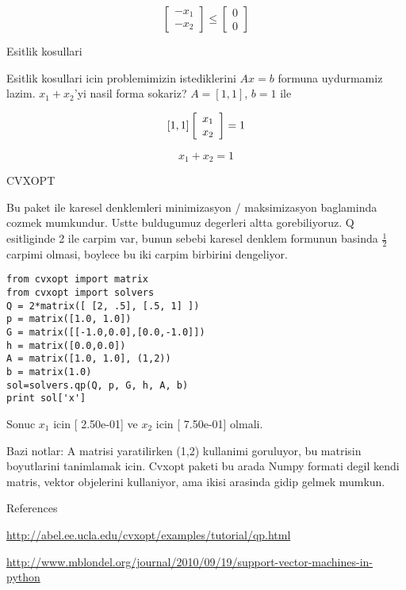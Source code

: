 \documentclass[12pt,fleqn]{article}\usepackage{../common}
\begin{document}
\[ 
\left[ \begin{array}{c}
    -x_1 \\
    -x_2
\end{array} \right]
\leq
\left[ \begin{array}{c}
    0 \\
    0
\end{array} \right]
 \]

Esitlik kosullari

Esitlik kosullari icin problemimizin istediklerini $Ax = b$ formuna uydurmamiz
lazim. $x_1 + x_2$'yi nasil forma sokariz? $A = [1, 1]$, $b = 1$ ile

\[ 
[1, 1] \left[ \begin{array}{c}
    x_1 \\
    x_2
\end{array} \right] 
= 1 \\
 \]

\[ x_1 + x_2 = 1 \]

CVXOPT

Bu paket ile karesel denklemleri minimizasyon / maksimizasyon baglaminda cozmek
mumkundur. Ustte buldugumuz degerleri altta gorebiliyoruz. Q esitliginde 2 ile
carpim var, bunun sebebi karesel denklem formunun basinda $\frac{1}{2}$ carpimi
olmasi, boylece bu iki carpim birbirini dengeliyor.

\begin{verbatim}
from cvxopt import matrix
from cvxopt import solvers
Q = 2*matrix([ [2, .5], [.5, 1] ])
p = matrix([1.0, 1.0])
G = matrix([[-1.0,0.0],[0.0,-1.0]])
h = matrix([0.0,0.0])
A = matrix([1.0, 1.0], (1,2))
b = matrix(1.0)
sol=solvers.qp(Q, p, G, h, A, b)
print sol['x']
\end{verbatim}

Sonuc $x_1$ icin [ 2.50e-01] ve $x_2$ icin [ 7.50e-01] olmali.

Bazi notlar: A matrisi yaratilirken (1,2) kullanimi goruluyor, bu matrisin
boyutlarini tanimlamak icin. Cvxopt paketi bu arada Numpy formati degil kendi
matris, vektor objelerini kullaniyor, ama ikisi arasinda gidip gelmek mumkun. 

References

\url{http://abel.ee.ucla.edu/cvxopt/examples/tutorial/qp.html}

\url{http://www.mblondel.org/journal/2010/09/19/support-vector-machines-in-python}
\end{document}
